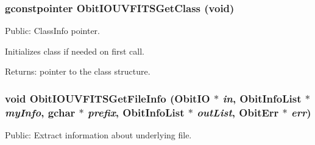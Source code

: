 \subsubsection{\setlength{\rightskip}{0pt plus 5cm}gconstpointer Obit\-IOUVFITSGet\-Class (void)}\label{ObitIOUVFITS_8h_a5}


Public: Class\-Info pointer. 

Initializes class if needed on first call. \begin{Desc}
\item[Returns:]pointer to the class structure. \end{Desc}
\subsubsection{\setlength{\rightskip}{0pt plus 5cm}void Obit\-IOUVFITSGet\-File\-Info ({\bf Obit\-IO} $\ast$ {\em in}, {\bf Obit\-Info\-List} $\ast$ {\em my\-Info}, gchar $\ast$ {\em prefix}, {\bf Obit\-Info\-List} $\ast$ {\em out\-List}, {\bf Obit\-Err} $\ast$ {\em err})}\label{ObitIOUVFITS_8h_a26}


Public: Extract information about underlying file. 

